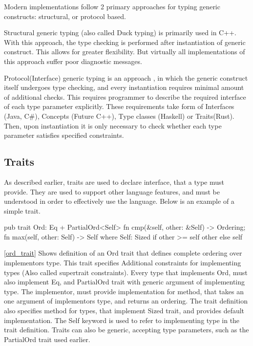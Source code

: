 Modern implementations follow 2 primary approaches for typing generic constructs: structural, or protocol based.

Structural generic typing (also called Duck typing) is primarily used in C++. With this approach, the type
checking is performed after instantiation of generic construct. This allows for greater flexibility.
But virtually all implementations of this approach suffer poor diagnostic messages\cite{Traver:2010:CEM:1863617.1945532}.

Protocol(Interface) generic typing is an approach , in which the generic construct itself undergoes type checking, and
every instantiation requires minimal amount of additional checks. This requires programmer to describe the required interface
of each type parameter explicitly. These requirements take form of Interfaces (Java, C\#), Concepts (Future C++),
Type classes (Haskell) or Traits(Rust). Then, upon instantiation it is only necessary to check whether
each type parameter satisfies specified constraints.

\subsection{Traits}
As described earlier, traits are used to declare interface, that a type must provide. They are used to support
other language features, and must be understood in order to effectively use the language.
Below is an example of a simple trait.


\begin{code}[language=rust,label={ord_trait},caption={Trait definition}]
pub trait Ord: Eq + PartialOrd<Self> {
    fn cmp(&self, other: &Self) -> Ordering;
    fn max(self, other: Self) -> Self where Self: Sized {
        if other >= self { other } else { self }
    }
}
\end{code}

\autoref{ord_trait} Shows definition of an Ord trait that defines complete ordering over implementors type. This trait specifies Additional constraints for implementing types
(Also called supertrait constraints). Every type that implements Ord, must also implement Eq, and PartialOrd trait with generic
argument of implementing type. The implementor, must provide implementation for  method, that takes an one argument of implementors type,
and returns an ordering. The trait definition also specifies  method for types, that implement Sized trait, and provides default
implementation.
The Self keyword is used to refer to implementing type in the trait definition.
Traits can also be generic, accepting type parameters, such as the PartialOrd trait used earlier.

